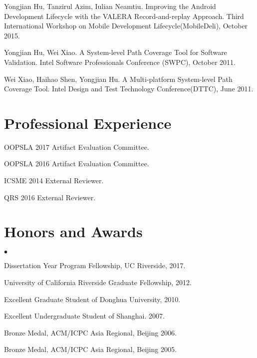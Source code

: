 \documentclass[margin,line]{res}
\newenvironment{list2}{
  \begin{list}{$\bullet$}{%
      \setlength{\itemsep}{0in}
      \setlength{\parsep}{0in} \setlength{\parskip}{0in}
      \setlength{\topsep}{0in} \setlength{\partopsep}{0in} 
      \setlength{\leftmargin}{0.2in}}}{\end{list}}
\begin{document}
\begin{resume}
Yongjian Hu, Tanzirul Azim, Iulian Neamtiu. Improving the Android Development Lifecycle with the VALERA Record-and-replay Approach.
Third International Workshop on Mobile Development Lifecycle(MobileDeli), October 2015.


Yongjian Hu, Wei Xiao. A System-level Path Coverage Tool for Software Validation.
Intel Software Professionals Conference (SWPC), October 2011.

Wei Xiao, Haihao Shen, Yongjian Hu. A Multi-platform System-level Path Coverage Tool.
Intel Design and Test Technology Conference(DTTC), June 2011.







\section{\sc Professional Experience}
OOPSLA 2017 Artifact Evaluation Committee.

\vspace*{-2.5mm}
OOPSLA 2016 Artifact Evaluation Committee.

\vspace*{-2.5mm}
ICSME 2014 External Reviewer.

\vspace*{-2.5mm}
QRS 2016 External Reviewer.


\section{\sc Honors and Awards} 
\begin{list2}
\item Dissertation Year Program Fellowship, UC Riverside, 2017.
\item University of California Riverside Graduate Fellowship, 2012.
\item Excellent Graduate Student of Donghua University, 2010.
\item Excellent Undergraduate Student of Shanghai. 2007.
\item Bronze Medal, ACM/ICPC Asia Regional, Beijing 2006.
\item Bronze Medal, ACM/ICPC Asia Regional, Beijing 2005.
\end{list2}



\end{resume}
\end{document}
